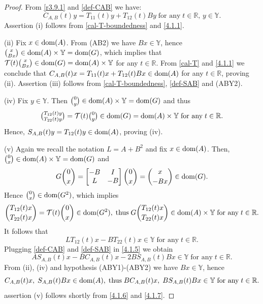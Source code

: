 \documentclass[11pt]{amsart}
\numberwithin{equation}{section}
\newcommand{\SAB}{S_{A,B}}
\newcommand{\CAB}{C_{A,B}}
\theoremstyle{remark}
\theoremstyle{definition}
\newcommand\cT{{\mathcal T}}
\newcommand\bY{{\mathbb Y}}
\newcommand{\dom}{\text{\rm{dom}}}
\begin{document}
\begin{proof} From \eqref{r3.9.1} and \eqref{def-CAB} we have:
	\begin{equation}\label{4.1.1}
		\CAB(t)y = T_{11}(t)y + T_{12}(t)By\;\text{for any}\; t \in \mathbb{R},\, y \in\bY. 
	\end{equation}
	\noindent Assertion (i) follows from \eqref{cal-T-boundedness} and \eqref{4.1.1}.
	
	\noindent(ii) Fix $x \in \dom(A)$. From (AB2) we have $Bx \in \bY$, hence $\tbinom{x}{Bx} \in \dom(A) \times \bY = \dom(G)$, which implies that $\cT(t)\tbinom{x}{Bx} \in \dom(G) = \dom(A) \times \bY$ for any $t \in \mathbb{R}$. From \eqref{cal-T} and \eqref{4.1.1} we conclude that $\CAB(t)x = T_{11}(t)x + T_{12}(t)Bx \in \dom(A)$ for any $t \in \mathbb{R}$, proving (ii).
	Assertion (iii) follows from \eqref{cal-T-boundedness}, \eqref{def-SAB} and (ABY2).
	
	(iv) Fix $y \in \bY$. Then $\tbinom{0}{y} \in \dom(A) \times \bY = \dom(G)$ and thus
	\begin{equation}\label{4.1.2}
		\tbinom{T_{12}(t)y}{T_{22}(t)y} = \cT(t)\tbinom{0}{y} \in \dom(G) = \dom(A) \times \bY \;\text{for any}\; t \in \mathbb{R}.
	\end{equation}
	Hence, $\SAB(t)y = T_{12}(t)y \in \dom(A)$, proving (iv). 
	
	(v) Again we recall the notation $L = A + B^2$ and fix $x \in \dom(A)$. Then, $\tbinom{0}{x} \in \dom(A) \times \bY = \dom(G)$ and
	\begin{equation}\label{4.1.3}
		G\binom{0}{x}
		= \begin{bmatrix} -B & I \\ L & -B \end{bmatrix}\binom{0}{x}
		= \binom{x}{-Bx} \in \dom(G). 
	\end{equation}
	Hence $\binom{0}{x} \in \dom(G^2)$, which implies 
	\begin{equation}\label{4.1.4}
		\binom{T_{12}(t)x}{T_{22}(t)x} = \cT(t)\binom{0}{x} \in \dom(G^2),\;\mbox{thus}\;
		G\binom{T_{12}(t)x}{T_{22}(t)x} \in \dom(A) \times \bY	\; \text{for any}\; t \in \mathbb{R}. 
	\end{equation}
	It follows that
	\begin{equation}\label{4.1.5}
		LT_{12}(t)x - BT_{22}(t)x \in \bY \;\text{for any}\; t \in \mathbb{R}. 
	\end{equation}
	Plugging \eqref{def-CAB} and \eqref{def-SAB}  in \eqref{4.1.5} we obtain
	\begin{equation}\label{4.1.6}
		A\SAB(t)x - BC_{A,B}(t)x - 2BS_{A,B}(t)Bx \in \bY \;\text{for any}\; t \in \mathbb{R}. 
	\end{equation}
	From (ii), (iv) and hypothesis (ABY1)-(ABY2) we have $Bx \in \bY$, hence
	\begin{equation}\label{4.1.7}
		\CAB(t)x,\; \SAB(t)Bx \in \dom(A), \; \text{thus}\; BC_{A,B}(t)x,\; BS_{A,B}(t)Bx \in \bY\;\text{for any}\; t \in \mathbb{R}. 
	\end{equation}
	assertion (v) follows shortly from \eqref{4.1.6} and \eqref{4.1.7}.
\end{proof}
\end{document}
